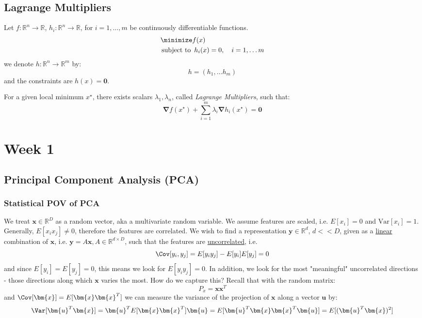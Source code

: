 \documentclass{article}
\begin{document}
\subsection{Lagrange Multipliers}
Let $f: \mathbb{R}^{n} \to \mathbb{R}$, $h_i: \mathbb{R}^{n} \to \mathbb{R}$, for $i=1, \ldots, m$ be continuously differentiable functions. 
\begin{align*}
  &\minimize f(x) \\
  &\operatorname*{\text{subject to}} \ h_i(x) = 0, \quad i=1, \ldots  m
\end{align*}
we denote $h: \mathbb{R}^{n} \to \mathbb{R}^{m}$ by:
\[
  h = (h_1, \ldots  h_m)
\]
and the constraints are $h(x)=\bm{0}$. 
\begin{theorem}  For a given local minimum $x ^{\star}$, there exists scalars $\lambda_1, \lambda_n$, called \textit{Lagrange Multipliers}, such that:
\[
  \bm{\nabla}f(x ^{\star}) + \sum_{i=1}^{m}  \lambda_i \bm{\nabla} h_i(x ^{\star}) = \bm{0}
\]

\end{theorem}


\section{Week 1}
\subsection{Principal Component Analysis (PCA)}
\subsubsection{Statistical POV of PCA}
We treat $\bm{x} \in \mathbb{R}^{D}$ as a random vector, aka a multivariate random variable. We assume features are scaled, i.e. $E[x_i]=0$ and $\text{Var}[x_i]=1$.  Generally, $E[x_i x_j] \neq 0$, therefore the features are correlated. We wish to find a representation $\bm{y} \in \mathbb{R}^{d}$, $d <<D$, given as a \ul{linear} combination of $\bm{x}$, i.e. $\bm{y}=A \bm{x}, A \in \mathbb{R}^{d \times D}$, such that the features are \ul{uncorrelated}, i.e.
\[
  \Cov[y_i,y_j]= E[y_i y_j] - E[y_i] E[y_j] =  0
\]
and since $E[y_i]=E[y_j]=0$, this means we look for $E[y_i y_j]=0$. In addition, we look for the most "meaningful" uncorrelated directions - those directions along which $\bm{x}$ varies the most. How do we capture this? Recall that with the random matrix:
\[
  P_{x} = \bm{x} \bm{x}^{T}
\]
and $\Cov[\bm{x}] = E[\bm{x} \bm{x}^{T}]$
we can measure the variance of the projection of $\bm{x}$ along a vector $\bm{u}$ by:
\[
  \Var[\bm{u} ^{T} \bm{x}] = \bm{u}^{T} E[\bm{x} \bm{x}^{T}] \bm{u} = E[\bm{u}^{T} \bm{x} \bm{x} ^{T} \bm{u}] = E[(\bm{u}^{T} \bm{x}) ^2]
\]
\end{document}
